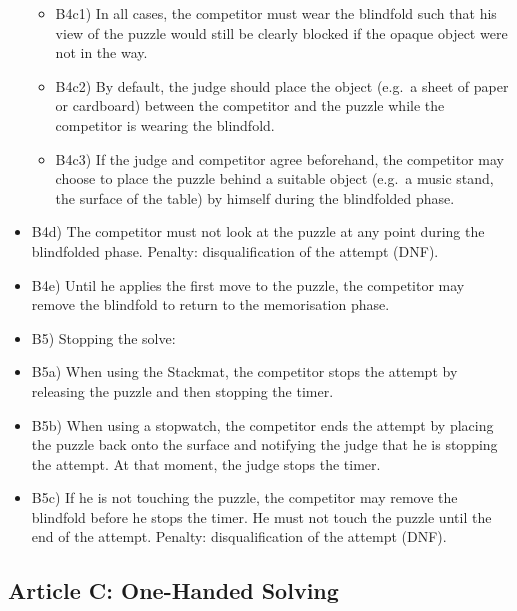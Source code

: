 \begin{itemize}
  \begin{itemize}
  \item
    B4c1) In all cases, the competitor must wear the blindfold such that
    his view of the puzzle would still be clearly blocked if the opaque
    object were not in the way.
  \item
    B4c2) By default, the judge should place the object (e.g.~a sheet of
    paper or cardboard) between the competitor and the puzzle while the
    competitor is wearing the blindfold.
  \item
    B4c3) If the judge and competitor agree beforehand, the competitor
    may choose to place the puzzle behind a suitable object (e.g.~a
    music stand, the surface of the table) by himself during the
    blindfolded phase.
  \end{itemize}
\item
  B4d) The competitor must not look at the puzzle at any point during
  the blindfolded phase. Penalty: disqualification of the attempt (DNF).
\item
  B4e) Until he applies the first move to the puzzle, the competitor may
  remove the blindfold to return to the memorisation phase.
\item
  B5) Stopping the solve:
\item
  B5a) When using the Stackmat, the competitor stops the attempt by
  releasing the puzzle and then stopping the timer.
\item
  B5b) When using a stopwatch, the competitor ends the attempt by
  placing the puzzle back onto the surface and notifying the judge that
  he is stopping the attempt. At that moment, the judge stops the timer.
\item
  B5c) If he is not touching the puzzle, the competitor may remove the
  blindfold before he stops the timer. He must not touch the puzzle
  until the end of the attempt. Penalty: disqualification of the attempt
  (DNF).
\end{itemize}

\subsection{ Article C: One-Handed Solving}

